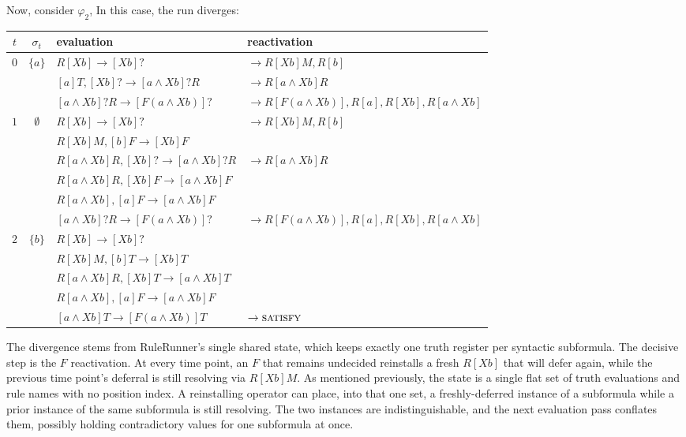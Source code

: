 Now, consider $\varphi_2$, In this case, the run diverges:
\begin{center}\small
\begin{tabular}{c c l l}
\toprule
$t$ & $\sigma_t$ & evaluation & reactivation\\
\midrule
\multirow{3}{*}{$0$} & \multirow{3}{*}{$\{a\}$} & $R[Xb] \rightarrow [Xb]?$ & $\rightarrow R[Xb]M,R[b]$ \\
&  & $[a]T,[Xb]? \rightarrow [a \land Xb]?R$ & $\rightarrow R[a \land Xb]R$  \\
&  & $[a \land Xb]?R \rightarrow [F(a \land Xb)]?$ & $\rightarrow R[F(a \land Xb)],R[a],R[Xb],R[a \land Xb]$ \\[1.5ex]

\multirow{6}{*}{$1$} & \multirow{6}{*}{$\emptyset$} & $R[Xb] \rightarrow [Xb]?$ & $\rightarrow R[Xb]M,R[b]$ \\
& & $R[Xb]M, [b]F \rightarrow [Xb]F$ & \\
&  & $R[a \land Xb]R,[Xb]? \rightarrow [a \land Xb]?R$ & $\rightarrow R[a \land Xb]R$  \\
&  & $R[a \land Xb]R,[Xb]F \rightarrow [a \land Xb]F$ &  \\
&  & $R[a \land Xb],[a]F \rightarrow [a \land Xb]F$ &  \\
&  & $[a \land Xb]?R \rightarrow [F(a \land Xb)]?$ & $\rightarrow R[F(a \land Xb)],R[a],R[Xb],R[a \land Xb]$ \\[1.5ex]

\multirow{5}{*}{$2$} & \multirow{5}{*}{$\{b\}$} & $R[Xb] \rightarrow [Xb]?$ & \\
& & $R[Xb]M, [b]T \rightarrow [Xb]T$ & \\
&  & $R[a \land Xb]R,[Xb]T \rightarrow [a \land Xb]T$ &  \\
&  & $R[a \land Xb],[a]F \rightarrow [a \land Xb]F$ &  \\
&  & $[a \land Xb]T \rightarrow [F(a \land Xb)]T$ & $\rightarrow \textsc{satisfy}$ \\
\bottomrule
\end{tabular}
\end{center}

\noindent
The divergence stems from RuleRunner's single shared state, which keeps exactly one truth register per syntactic subformula.
The decisive step is the $F$ reactivation. At every time point, an $F$ that remains undecided reinstalls a fresh $R[Xb]$ that will defer again, while the previous time point's deferral is still resolving via $R[Xb]M$. As mentioned previously, the state is a single flat set of truth evaluations and rule names with no position index. A reinstalling operator can place, into that one set, a freshly-deferred instance of a subformula while a prior instance of the same subformula is still resolving. The two instances are indistinguishable, and the next evaluation pass conflates them, possibly holding contradictory values for one subformula at once. %


